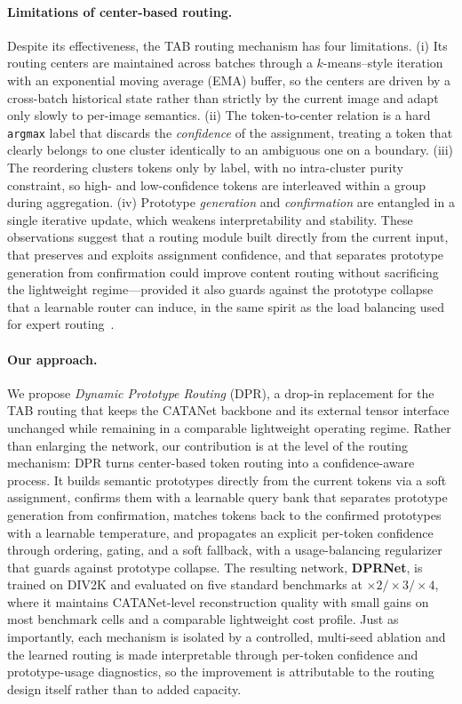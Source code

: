 \paragraph{Limitations of center-based routing.}
Despite its effectiveness, the TAB routing mechanism has four limitations.
(i) Its routing centers are maintained across batches through a $k$-means--style
iteration with an exponential moving average (EMA) buffer, so the centers are
driven by a cross-batch historical state rather than strictly by the current
image and adapt only slowly to per-image semantics. (ii) The token-to-center
relation is a hard \texttt{argmax} label that discards the \emph{confidence} of
the assignment, treating a token that clearly belongs to one cluster identically
to an ambiguous one on a boundary. (iii) The reordering clusters tokens only by
label, with no intra-cluster purity constraint, so high- and low-confidence tokens
are interleaved within a group during aggregation. (iv) Prototype \emph{generation}
and \emph{confirmation} are entangled in a single iterative update, which weakens
interpretability and stability. These observations suggest that a routing module
built directly from the current input, that preserves and exploits assignment
confidence, and that separates prototype generation from confirmation could
improve content routing without sacrificing the lightweight regime---provided it
also guards against the prototype collapse that a learnable router can induce, in
the same spirit as the load balancing used for expert routing~\cite{he2026mordasr}.

\paragraph{Our approach.}
We propose \emph{Dynamic Prototype Routing} (DPR), a drop-in replacement for the
TAB routing that keeps the CATANet backbone and its external tensor interface
unchanged while remaining in a comparable lightweight operating regime. Rather than
enlarging the network, our contribution is at the level of the routing mechanism:
DPR turns center-based token routing into a confidence-aware process. It builds
semantic prototypes directly from the current tokens via a soft assignment, confirms
them with a learnable query bank that separates prototype generation from
confirmation, matches tokens back to the confirmed prototypes with a learnable
temperature, and propagates an explicit per-token confidence through ordering,
gating, and a soft fallback, with a usage-balancing regularizer that guards against
prototype collapse. The resulting network, \textbf{DPRNet}, is trained on DIV2K and
evaluated on five standard benchmarks at $\times2/\times3/\times4$, where it maintains
CATANet-level reconstruction quality with small gains on most benchmark cells and a
comparable lightweight cost profile. Just as importantly, each mechanism is isolated
by a controlled, multi-seed ablation and the learned routing is made interpretable
through per-token confidence and prototype-usage diagnostics, so the improvement is
attributable to the routing design itself rather than to added capacity.

